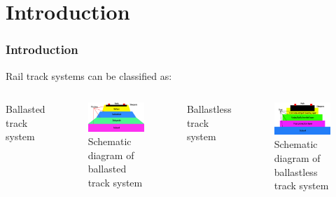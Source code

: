 \section{Introduction}
\begin{frame}
	\frametitle{Introduction}
	Rail track systems can be classified as:
	\begin{columns}
	Ballasted track system
		\begin{figure}
		\centering
		\includegraphics[width=0.7\linewidth]{./imgs/ballast}
		\caption{Schematic diagram of ballasted track system}
		\label{fig:ballast}
		\end{figure}
	Ballastless track system
		\begin{figure}
		\centering
		\includegraphics[width=0.7\linewidth]{./imgs/ballastless}
		\caption{Schematic diagram of ballastless track system}
		\label{fig:ballastless}
		\end{figure}
	\end{columns}
\end{frame}